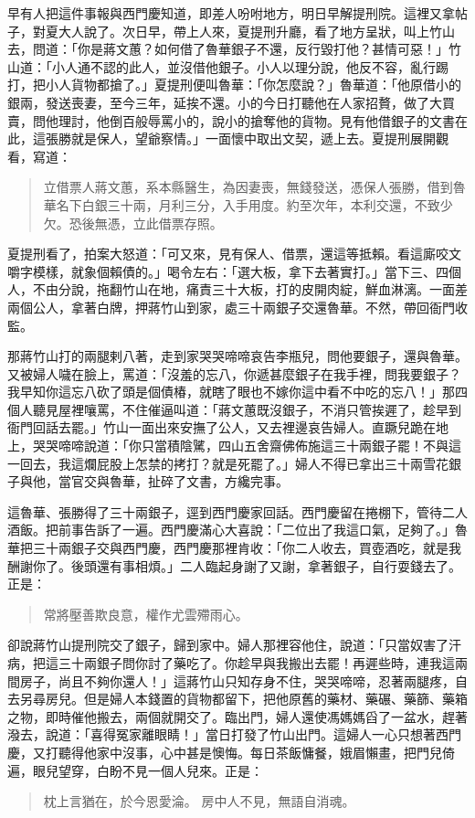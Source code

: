 早有人把這件事報與西門慶知道，即差人吩咐地方，明日早解提刑院。這裡又拿帖子，對夏大人說了。次日早，帶上人來，夏提刑升廳，看了地方呈狀，叫上竹山去，問道：「你是蔣文蕙？如何借了魯華銀子不還，反行毀打他？甚情可惡！」竹山道：「小人通不認的此人，並沒借他銀子。小人以理分說，他反不容，亂行踢打，把小人貨物都搶了。」夏提刑便叫魯華：「你怎麼說？」魯華道：「他原借小的銀兩，發送喪妻，至今三年，延挨不還。小的今日打聽他在人家招贅，做了大買賣，問他理討，他倒百般辱罵小的，說小的搶奪他的貨物。見有他借銀子的文書在此，這張勝就是保人，望爺察情。」一面懷中取出文契，遞上去。夏提刑展開觀看，寫道：
\begin{quote}
立借票人蔣文蕙，系本縣醫生，為因妻喪，無錢發送，憑保人張勝，借到魯華名下白銀三十兩，月利三分，入手用度。約至次年，本利交還，不致少欠。恐後無憑，立此借票存照。
\end{quote}

夏提刑看了，拍案大怒道：「可又來，見有保人、借票，還這等抵賴。看這廝咬文嚼字模樣，就象個賴債的。」喝令左右：「選大板，拿下去著實打。」當下三、四個人，不由分說，拖翻竹山在地，痛責三十大板，打的皮開肉綻，鮮血淋漓。一面差兩個公人，拿著白牌，押蔣竹山到家，處三十兩銀子交還魯華。不然，帶回衙門收監。

那蔣竹山打的兩腿剌八著，走到家哭哭啼啼哀告李瓶兒，問他要銀子，還與魯華。又被婦人噦在臉上，罵道：「沒羞的忘八，你遞甚麼銀子在我手裡，問我要銀子？我早知你這忘八砍了頭是個債椿，就瞎了眼也不嫁你這中看不中吃的忘八！」那四個人聽見屋裡嚷罵，不住催逼叫道：「蔣文蕙既沒銀子，不消只管挨遲了，趁早到衙門回話去罷。」竹山一面出來安撫了公人，又去裡邊哀告婦人。直蹶兒跪在地上，哭哭啼啼說道：「你只當積陰騭，四山五舍齋佛佈施這三十兩銀子罷！不與這一回去，我這爛屁股上怎禁的拷打？就是死罷了。」婦人不得已拿出三十兩雪花銀子與他，當官交與魯華，扯碎了文書，方纔完事。

這魯華、張勝得了三十兩銀子，逕到西門慶家回話。西門慶留在捲棚下，管待二人酒飯。把前事告訴了一遍。西門慶滿心大喜說：「二位出了我這口氣，足夠了。」魯華把三十兩銀子交與西門慶，西門慶那裡肯收：「你二人收去，買壺酒吃，就是我酬謝你了。後頭還有事相煩。」二人臨起身謝了又謝，拿著銀子，自行耍錢去了。正是：
\begin{quote}
常將壓善欺良意，權作尤雲殢雨心。
\end{quote}

卻說蔣竹山提刑院交了銀子，歸到家中。婦人那裡容他住，說道：「只當奴害了汗病，把這三十兩銀子問你討了藥吃了。你趁早與我搬出去罷！再遲些時，連我這兩間房子，尚且不夠你還人！」這蔣竹山只知存身不住，哭哭啼啼，忍著兩腿疼，自去另尋房兒。但是婦人本錢置的貨物都留下，把他原舊的藥材、藥碾、藥篩、藥箱之物，即時催他搬去，兩個就開交了。臨出門，婦人還使馮媽媽舀了一盆水，趕著潑去，說道：「喜得冤家離眼睛！」當日打發了竹山出門。這婦人一心只想著西門慶，又打聽得他家中沒事，心中甚是懊悔。每日茶飯慵餐，娥眉懶畫，把門兒倚遍，眼兒望穿，白盼不見一個人兒來。正是：
\begin{quote}
枕上言猶在，於今恩愛淪。
房中人不見，無語自消魂。
\end{quote}

